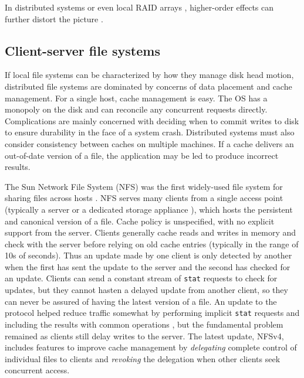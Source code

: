 In distributed systems or even local RAID arrays \cite{patterson}, higher-order effects can further distort the picture \cite{stein05}.

\subsection{Client-server file systems}

If local file systems can be characterized by how they manage disk head motion, distributed file systems are dominated by concerns of data placement and cache management. For a single host, cache management is easy. The OS has a monopoly on the disk and can reconcile any concurrent requests directly. Complications are mainly concerned with deciding when to commit writes to disk to ensure durability in the face of a system crash. Distributed systems must also consider consistency between caches on multiple machines. If a cache delivers an out-of-date version of a file, the application may be led to produce incorrect results.

The Sun Network File System (NFS) was the first widely-used file system for sharing files across hosts \cite{sandberg}. NFS serves many clients from a single access point (typically a server or a dedicated storage appliance \cite{hitz}), which hosts the persistent and canonical version of a file. Cache policy is unspecified, with no explicit support from the server. Clients generally cache reads and writes in memory and check with the server before relying on old cache entries (typically in the range of 10s of seconds). Thus an update made by one client is only detected by another when the first has sent the update to the server and the second has checked for an update. Clients can send a constant stream of \texttt{stat} requests to check for updates, but they cannot hasten a delayed update from another client, so they can never be assured of having the latest version of a file. An update to the protocol helped reduce traffic somewhat by performing implicit \texttt{stat} requests and including the results with common operations \cite{pawlowski,callaghan}, but the fundamental problem remained as clients still delay writes to the server. The latest update, NFSv4, includes features to improve cache management by \emph{delegating} complete control of individual files to clients and \emph{revoking} the delegation when other clients seek concurrent access.

